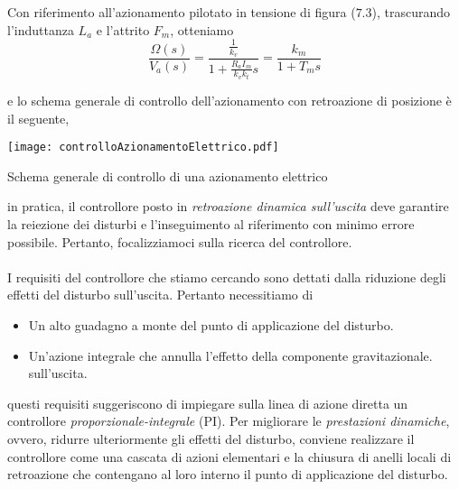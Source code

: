 Con riferimento all'azionamento pilotato in tensione di figura ($7.3$), trascurando l'induttanza $L_a$ e l'attrito $F_m$, otteniamo
\begin{equation}
	\frac{\Omega(s)}{V_a(s)} = \frac{\frac{1}{k_v}}{1+ \frac{R_a I_m}{k_v k_t} s} = \frac{k_m}{1+ T_m s}
\end{equation}

e lo schema generale di controllo dell'azionamento con retroazione di posizione è il seguente,

\begin{center}
	\texttt{[image: controlloAzionamentoElettrico.pdf]}
	\caption{Schema generale di controllo di una azionamento elettrico}
\end{center}
in pratica, il controllore posto in \emph{retroazione dinamica sull'uscita} deve garantire la reiezione dei disturbi e l'inseguimento al riferimento con minimo errore possibile. Pertanto, focalizziamoci sulla ricerca del controllore.

\paragraph{}
I requisiti del controllore che stiamo cercando sono dettati dalla riduzione degli effetti del disturbo sull'uscita. Pertanto necessitiamo di
\begin{itemize}
	\item Un alto guadagno a monte del punto di applicazione del disturbo.
	\item Un'azione integrale che annulla l'effetto della componente gravitazionale. sull'uscita.
\end{itemize}
questi requisiti suggeriscono di impiegare sulla linea di azione diretta un controllore \emph{proporzionale-integrale} (PI). Per migliorare le \emph{prestazioni dinamiche}, ovvero, ridurre ulteriormente gli effetti del disturbo, conviene realizzare il controllore come una cascata di azioni elementari e la chiusura di anelli locali di retroazione che contengano al loro interno il punto di applicazione del disturbo.

